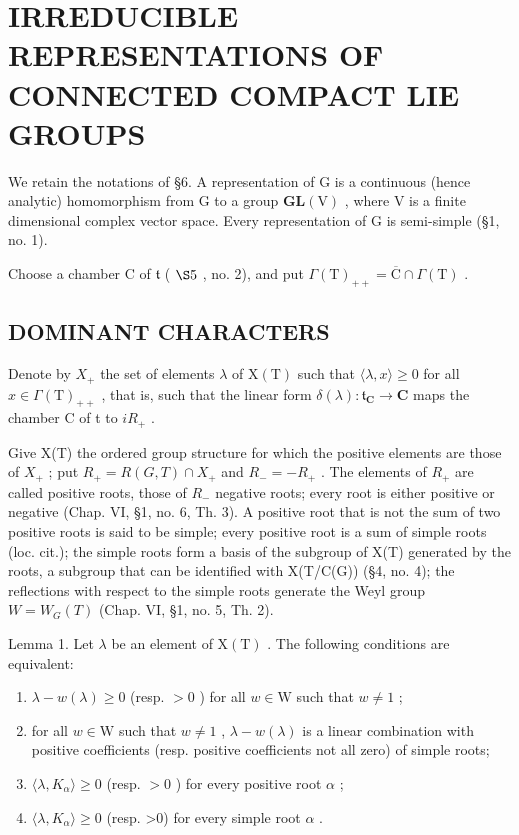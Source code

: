 \section{IRREDUCIBLE REPRESENTATIONS OF CONNECTED COMPACT LIE GROUPS}

We retain the notations of §6. A representation of G is a continuous (hence analytic) homomorphism from G to a group \(\mathbf{GL}(\mathrm{V})\) , where V is a finite dimensional complex vector space. Every representation of G is semi-simple (§1, no. 1).

Choose a chamber C of \(\mathfrak{t}\) ( \(\S 5\) , no. 2), and put \(\Gamma(\mathrm{T})_{++} = \overline{\mathrm{C}} \cap \Gamma(\mathrm{T})\) .

\subsection{DOMINANT CHARACTERS}

Denote by \(X_{+}\) the set of elements \(\lambda\) of \(\mathrm{X(T)}\) such that \(\langle\lambda,x\rangle\geq0\) for all \(x\in\Gamma(\mathrm{T})_{++}\) , that is, such that the linear form \(\delta(\lambda):\mathfrak{t}_{\mathbf{C}}\to\mathbf{C}\) maps the chamber C of t to \(iR_{+}\) .

Give X(T) the ordered group structure for which the positive elements are those of \(X_{+}\) ; put \(R_{+} = R(G, T) \cap X_{+}\) and \(R_{-} = -R_{+}\) . The elements of \(R_{+}\) are called positive roots, those of \(R_{-}\) negative roots; every root is either positive or negative (Chap. VI, §1, no. 6, Th. 3). A positive root that is not the sum of two positive roots is said to be simple; every positive root is a sum of simple roots (loc. cit.); the simple roots form a basis of the subgroup of X(T) generated by the roots, a subgroup that can be identified with X(T/C(G)) (§4, no. 4); the reflections with respect to the simple roots generate the Weyl group \(W = W_{G}(T)\) (Chap. VI, §1, no. 5, Th. 2).

Lemma 1. Let \(\lambda\) be an element of \(\mathrm{X(T)}\) . The following conditions are equivalent:

\begin{enumerate}
\def\labelenumi{(\roman{enumi})}
\item
  \(\lambda - w(\lambda) \geq 0\) (resp. \(>0\) ) for all \(w \in \mathrm{W}\) such that \(w \neq 1\) ;
\item
  for all \(w \in \mathrm{W}\) such that \(w \neq 1\) , \(\lambda - w(\lambda)\) is a linear combination with positive coefficients (resp. positive coefficients not all zero) of simple roots;
\item
  \(\langle \lambda, K_{\alpha} \rangle \geq 0\) (resp. \(>0\) ) for every positive root \(\alpha\) ;
\item
  \(\langle\lambda,K_{\alpha}\rangle\geq0\) (resp. >0) for every simple root \(\alpha\) .
\end{enumerate}

